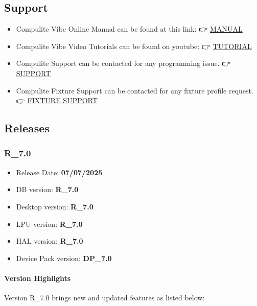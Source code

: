 \documentclass[
]{article}
\providecommand{\tightlist}{%
  \setlength{\itemsep}{0pt}\setlength{\parskip}{0pt}}
\begin{document}
\hypertarget{Support-1.5}{%
\subsection{Support}\label{Support-1.5}}

\begin{itemize}
\item
  Compulite Vibe Online Manual can be found at this link:
  👉 \href{https://vibemanual.compulite.com}{MANUAL}
\item
  Compulite Vibe Video Tutorials can be found on youtube:
  👉 \href{http://www.youtube.com/@compulitecompulite4933}{TUTORIAL}
\item
  Compulite Support can be contacted for any programming issue.
  👉 \href{mailto:support@compulite.com}{SUPPORT}
\item
  Compulite Fixture Support can be contacted for any fixture profile request.
  👉 \href{mailto:fixturesupport@compulite.com}{FIXTURE SUPPORT}
\end{itemize}

\hypertarget{Releases-1.6}{%
\subsection{Releases}\label{Releases-1.6}}

\hypertarget{r_7.0}{%
\subsubsection{R\_7.0}\label{r_7.0}}

\begin{itemize}
\tightlist
\item
  Release Date: \textbf{07/07/2025}
\item
  DB version: \textbf{R\_7.0}
\item
  Desktop version: \textbf{R\_7.0}
\item
  LPU version: \textbf{R\_7.0}
\item
  HAL version: \textbf{R\_7.0}
\item
  Device Pack version: \textbf{DP\_7.0}
\end{itemize}

\hypertarget{version-highlights}{%
\paragraph{Version Highlights}\label{version-highlights}}

Version R\_7.0 brings new and updated features as listed below:
\end{document}
